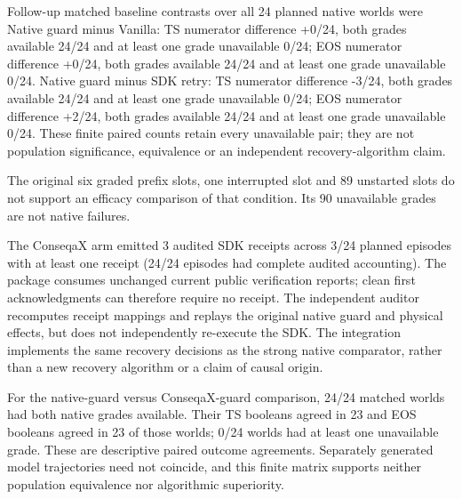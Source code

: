 Follow-up matched baseline contrasts over all 24 planned native worlds were Native guard minus Vanilla: TS numerator difference +0/24, both grades available 24/24 and at least one grade unavailable 0/24; EOS numerator difference +0/24, both grades available 24/24 and at least one grade unavailable 0/24. Native guard minus SDK retry: TS numerator difference -3/24, both grades available 24/24 and at least one grade unavailable 0/24; EOS numerator difference +2/24, both grades available 24/24 and at least one grade unavailable 0/24. These finite paired counts retain every unavailable pair; they are not population significance, equivalence or an independent recovery-algorithm claim.

The original six graded prefix slots, one interrupted slot and 89 unstarted slots do not support an efficacy comparison of that condition. Its 90 unavailable grades are not native failures.

\begin{table}[t]
\caption{Follow-up runtime condition. All-planned native results. Graded means an independently replayed native grade; it includes native error returns after settlement. Missing is not an invented semantic zero.}
\label{tab:limbo-results}\centering\small\setlength{\tabcolsep}{3pt}

\end{table}

The ConseqaX arm emitted 3 audited SDK receipts across 3/24 planned episodes with at least one receipt (24/24 episodes had complete audited accounting). The package consumes unchanged current public verification reports; clean first acknowledgments can therefore require no receipt. The independent auditor recomputes receipt mappings and replays the original native guard and physical effects, but does not independently re-execute the SDK. The integration implements the same recovery decisions as the strong native comparator, rather than a new recovery algorithm or a claim of causal origin.

For the native-guard versus ConseqaX-guard comparison, 24/24 matched worlds had both native grades available. Their TS booleans agreed in 23 and EOS booleans agreed in 23 of those worlds; 0/24 worlds had at least one unavailable grade. These are descriptive paired outcome agreements. Separately generated model trajectories need not coincide, and this finite matrix supports neither population equivalence nor algorithmic superiority.

